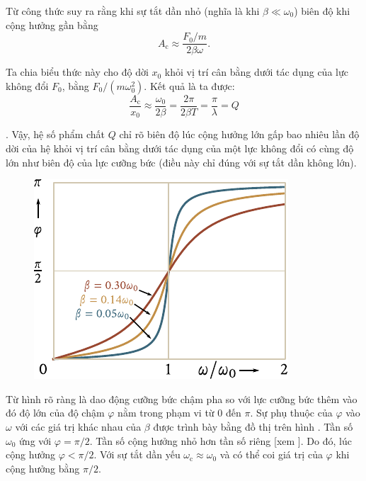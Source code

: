 Từ công thức  suy ra rằng khi sự tắt dần nhỏ (nghĩa là khi $\beta\ll\omega_0$) biên độ khi cộng hưởng gần bằng
\begin{equation*}
	A_{\text{c}} \approx \frac{F_0/m}{2\beta\omega}.
\end{equation*}

\noindent
Ta chia biểu thức này cho độ dời $x_0$ khỏi vị trí cân bằng dưới tác dụng của lực không đổi $F_0$, bằng $F_0/(m\omega_0^2)$. Kết quả là ta được:
\begin{equation}\label{eq:7_129}
	\frac{A_{\text{c}}}{x_0} \approx \frac{\omega_0}{2\beta} = \frac{2\pi}{2\beta T} = \frac{\pi}{\lambda} = Q
\end{equation}

. Vậy, hệ số phẩm chất $Q$ chỉ rõ biên độ lúc cộng hưởng lớn gấp bao nhiêu lần độ dời của hệ khỏi vị trí cân bằng dưới tác dụng của một lực không đổi có cùng độ lớn như biên độ của lực cưỡng bức (điều này chỉ đúng với sự tắt dần không lớn).

\begin{figure}[t]
	\begin{center}
		\includegraphics[scale=0.95]{figures/ch_07/fig_7_25.pdf}
		\caption[]{}
		\label{fig:7_25}
	\end{center}
	\vspace{-0.8cm}
\end{figure}

Từ hình  rõ ràng là dao động cưỡng bức chậm pha so với lực cưỡng bức thêm vào đó độ lớn của độ chậm $\varphi$ nằm trong phạm vi từ $0$ đến $\pi$. Sự phụ thuộc của $\varphi$ vào $\omega$ với các giá trị khác nhau của $\beta$ được trình bày bằng đồ thị trên hình . Tần số $\omega_0$ ứng với $\varphi=\pi/2$. Tần số cộng hưởng nhỏ hơn tần số riêng [xem ]. Do đó, lúc cộng hưởng $\varphi<\pi/2$. Với sự tắt dần yếu $\omega_{\text{c}}\approx\omega_0$ và có thể coi giá trị của $\varphi$ khi cộng hưởng bằng $\pi/2$.


